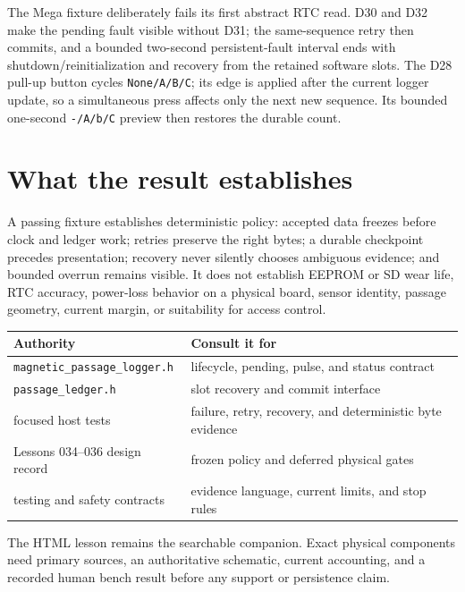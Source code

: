 \documentclass[11pt]{article}
\begin{document}
The Mega fixture deliberately fails its first abstract RTC read. D30 and D32
make the pending fault visible without D31; the same-sequence retry then
commits, and a bounded two-second persistent-fault interval ends with
shutdown/reinitialization and recovery from the retained software slots.
The D28 pull-up button cycles \texttt{None/A/B/C}; its edge is applied after
the current logger update, so a simultaneous press affects only the next new
sequence. Its bounded one-second \texttt{-/A/b/C} preview then restores the
durable count.

\section{What the result establishes}

A passing fixture establishes deterministic policy: accepted data freezes
before clock and ledger work; retries preserve the right bytes; a durable
checkpoint precedes presentation; recovery never silently chooses ambiguous
evidence; and bounded overrun remains visible. It does not establish EEPROM or
SD wear life, RTC accuracy, power-loss behavior on a physical board, sensor
identity, passage geometry, current margin, or suitability for access control.

\begin{tabularx}{\linewidth}{@{}l X@{}}
\toprule
Authority & Consult it for\\
\midrule
\texttt{magnetic\_passage\_logger.h} & lifecycle, pending, pulse, and status contract\\
\texttt{passage\_ledger.h} & slot recovery and commit interface\\
focused host tests & failure, retry, recovery, and deterministic byte evidence\\
Lessons 034--036 design record & frozen policy and deferred physical gates\\
testing and safety contracts & evidence language, current limits, and stop rules\\
\bottomrule
\end{tabularx}

The HTML lesson remains the searchable companion. Exact physical components
need primary sources, an authoritative schematic, current accounting, and a
recorded human bench result before any support or persistence claim.
\end{document}
